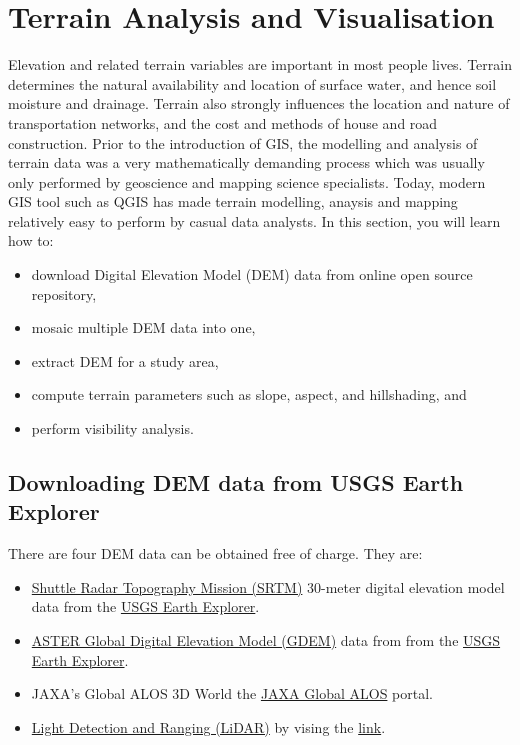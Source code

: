 \documentclass[
  letterpaper,
  DIV=11,
  numbers=noendperiod]{scrreprt}
\providecommand{\tightlist}{%
  \setlength{\itemsep}{0pt}\setlength{\parskip}{0pt}}\usepackage{longtable,booktabs,array}
\begin{document}
\hypertarget{terrain-analysis-and-visualisation}{%
\section{Terrain Analysis and
Visualisation}\label{terrain-analysis-and-visualisation}}

Elevation and related terrain variables are important in most people
lives. Terrain determines the natural availability and location of
surface water, and hence soil moisture and drainage. Terrain also
strongly influences the location and nature of transportation networks,
and the cost and methods of house and road construction. Prior to the
introduction of GIS, the modelling and analysis of terrain data was a
very mathematically demanding process which was usually only performed
by geoscience and mapping science specialists. Today, modern GIS tool
such as QGIS has made terrain modelling, anaysis and mapping relatively
easy to perform by casual data analysts. In this section, you will learn
how to:

\begin{itemize}
\tightlist
\item
  download Digital Elevation Model (DEM) data from online open source
  repository,
\item
  mosaic multiple DEM data into one,
\item
  extract DEM for a study area,
\item
  compute terrain parameters such as slope, aspect, and hillshading, and
\item
  perform visibility analysis.
\end{itemize}

\hypertarget{downloading-dem-data-from-usgs-earth-explorer}{%
\subsection{Downloading DEM data from USGS Earth
Explorer}\label{downloading-dem-data-from-usgs-earth-explorer}}

There are four DEM data can be obtained free of charge. They are:

\begin{itemize}
\tightlist
\item
  \href{https://gisgeography.com/srtm-shuttle-radar-topography-mission/}{Shuttle
  Radar Topography Mission (SRTM)} 30-meter digital elevation model data
  from the \href{https://earthexplorer.usgs.gov/}{USGS Earth Explorer}.
\item
  \href{https://asterweb.jpl.nasa.gov/gdem.asp}{ASTER Global Digital
  Elevation Model (GDEM)} data from from the
  \href{https://earthexplorer.usgs.gov/}{USGS Earth Explorer}.
\item
  JAXA's Global ALOS 3D World the
  \href{https://www.eorc.jaxa.jp/ALOS/en/index_e.htm}{JAXA Global ALOS}
  portal.
\item
  \href{https://www.usgs.gov/faqs/what-lidar-data-and-where-can-i-download-it}{Light
  Detection and Ranging (LiDAR)} by vising the
  \href{https://gisgeography.com/top-6-free-lidar-data-sources/}{link}.
\end{itemize}
\end{document}
